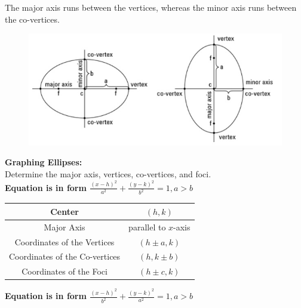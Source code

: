 \documentclass{article}
\begin{document}
    \noindent The major axis runs between the vertices, whereas the minor axis runs between
    the co-vertices. \\

    \begin{figure} [hbt!]
        \centering
        \includegraphics [scale=0.6] {Resources/Unit10Conics/ellipse1.jpg}
    \end{figure}

    \noindent \color{purple} \textbf{Graphing Ellipses:} \color{black} \\
    Determine the major axis, vertices, co-vertices, and foci. \\
    \textbf{Equation is in form $\frac{(x-h)^2}{a^2}+\frac{(y-k)^2}{b^2}=1, a>b$}

    \begin{center}
        \begin{tabular} {|c|c|}
            \hline
            Center                         & $(h,k)$              \\
            \hline
            Major Axis                     & parallel to $x$-axis \\
            \hline
            Coordinates of the Vertices    & $(h\pm a, k)$        \\
            \hline
            Coordinates of the Co-vertices & $(h,k \pm b)$        \\
            \hline
            Coordinates of the Foci        & $(h\pm c, k)$        \\
            \hline
        \end{tabular}
    \end{center}

    \noindent \textbf{Equation is in form $\frac{(x-h)^2}{b^2}+\frac{(y-k)^2}{a^2}=1, a>b$} \\
\end{document}
